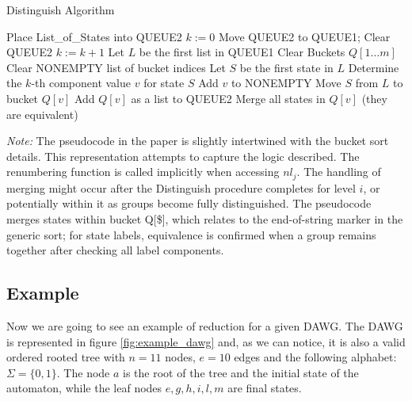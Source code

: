 \begin{algorithm}[h]
    \caption{Distinguish Algorithm} \label{alg:distinguish}
    \begin{algorithmic}[1] 
        \State Place List\_of\_States into QUEUE2 
        \State $k := 0$ 
        \Repeat
            \State Move QUEUE2 to QUEUE1; Clear QUEUE2
            \State $k := k + 1$
                \State Let $L$ be the first list in QUEUE1
                \State Clear Buckets $Q[1 \dots m]$ 
                \State Clear NONEMPTY list of bucket indices
                    \State Let $S$ be the first state in $L$
                    \State Determine the $k$-th component value $v$ for state $S$
                        \State Add $v$ to NONEMPTY
                    \EndIf
                    \State Move $S$ from $L$ to bucket $Q[v]$
                \EndWhile
                        \State Add $Q[v]$ as a list to QUEUE2 
                        \State Merge all states in $Q[v]$ (they are equivalent)
                    \EndIf
                \EndFor
            \EndWhile
         
        \EndFunction
    \end{algorithmic}
\end{algorithm}

\textit{Note:} The pseudocode in the paper is slightly intertwined with the bucket sort details. This representation attempts to capture the logic described. The renumbering function is called implicitly when accessing $nl_j$. The handling of merging might occur after the Distinguish procedure completes for level $i$, or potentially within it as groups become fully distinguished. The pseudocode merges states within bucket Q[\$], which relates to the end-of-string marker in the generic sort; for state labels, equivalence is confirmed when a group remains together after checking all label components.

\subsection{Example} 
Now we are going to see an example of reduction for a given DAWG. The DAWG is represented in figure \cref{fig:example_dawg} and, as we can notice, it is also a valid ordered rooted tree with $n = 11$ nodes, $e = 10$ edges and the following alphabet: $\Sigma = \{0, 1\}$. The node $a$ is the root of the tree and the initial state of the automaton, while the leaf nodes $e,g,h,i,l,m$ are final states.

